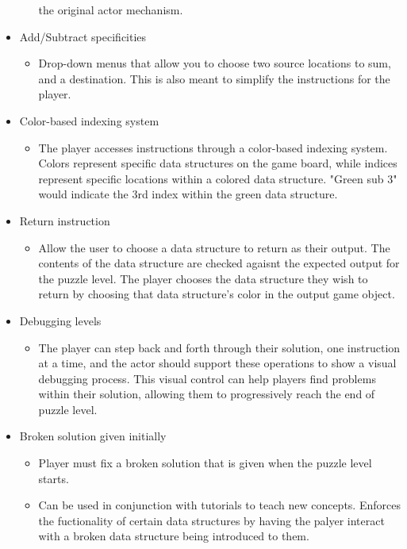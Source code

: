 \begin{itemize}
\begin{itemize}
    the original actor mechanism.
  \end{itemize}
  \item Add/Subtract specificities
  \begin{itemize}
    \item Drop-down menus that allow you to choose two source locations to sum, and
    a destination. This is also meant to simplify the instructions for the player.
  \end{itemize}
  \item Color-based indexing system
  \begin{itemize}
    \item The player accesses instructions through a color-based indexing system.
    Colors represent specific data structures on the game board, while indices represent
    specific locations within a colored data structure. "Green sub 3" would indicate the
    3rd index within the green data structure.
  \end{itemize}
  \item Return instruction
  \begin{itemize}
    \item Allow the user to choose a data structure to return as their output. The
    contents of the data structure are checked agaisnt the expected output for the
    puzzle level. The player chooses the data structure they wish to return by choosing
    that data structure's color in the output game object.
  \end{itemize}
  \item Debugging levels
  \begin{itemize}
    \item The player can step back and forth through their solution, one instruction at a time,
    and the actor should support these operations to show a visual debugging process. This
    visual control can help players find problems within their solution, allowing them to
    progressively reach the end of puzzle level.
  \end{itemize}
  \item Broken solution given initially
  \begin{itemize}
    \item Player must fix a broken solution that is given when the puzzle level starts.
    \item Can be used in conjunction with tutorials to teach new concepts. Enforces the fuctionality
    of certain data structures by having the palyer interact with a broken data structure being
    introduced to them.
  \end{itemize}
\end{itemize}

